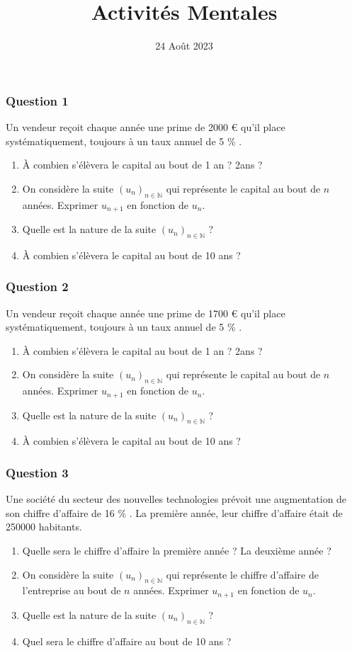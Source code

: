 \documentclass[15pt, mathserif]{beamer}
\title{Activités Mentales}
\date{24 Août 2023}
\newcommand{\N}{\mathbb{N}}			%
\newcommand{\st}[1]{$(#1_n)_{n \in \N}$}
\begin{document}
\begin{frame}
    \titlepage
\end{frame}

\begin{frame} 
	\frametitle{Question 1}
 Un vendeur reçoit chaque année une prime de  2000 \euro{} qu'il place systématiquement, toujours à un taux annuel de 5 \% . 
 \begin{enumerate} 
 	 \item À combien s'élèvera le capital au bout de 1 an ? 2ans ?  
 	 \item On considère la suite \st{u} qui représente le capital au bout de $n$ années. Exprimer $u_{n+1}$ en fonction de $u_n$. 
 	 \item Quelle est la nature de la suite \st{u} ? 
 	 \item  À combien s'élèvera le capital au bout de 10 ans ? 
 \end{enumerate} \end{frame}


\begin{frame} 
	\frametitle{Question 2}
 Un vendeur reçoit chaque année une prime de  1700 \euro{} qu'il place systématiquement, toujours à un taux annuel de 5 \% . 
 \begin{enumerate} 
 	 \item À combien s'élèvera le capital au bout de 1 an ? 2ans ?  
 	 \item On considère la suite \st{u} qui représente le capital au bout de $n$ années. Exprimer $u_{n+1}$ en fonction de $u_n$. 
 	 \item Quelle est la nature de la suite \st{u} ? 
 	 \item  À combien s'élèvera le capital au bout de 10 ans ? 
 \end{enumerate} \end{frame}


\begin{frame} 
	\frametitle{Question 3}
 Une société du secteur des nouvelles technologies prévoit une augmentation de son chiffre d'affaire de 16 \% . La première année, leur chiffre d'affaire était de  250000 habitants. 
 \begin{enumerate} 
 	 \item Quelle sera le chiffre d'affaire la première année ? La deuxième année ? 
 	 \item On considère la suite \st{u} qui représente le chiffre d'affaire de l'entreprise au bout de $n$ années. Exprimer $u_{n+1}$ en fonction de $u_n$. 
 	 \item Quelle est la nature de la suite \st{u} ? 
 	 \item Quel sera le chiffre d'affaire au bout de 10 ans ? 
 \end{enumerate} \end{frame}
\end{document}
